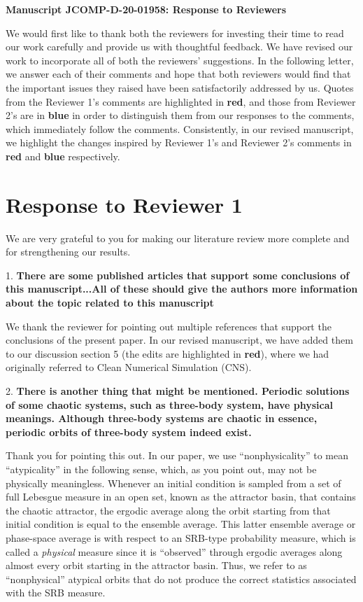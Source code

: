 \documentclass[11pt]{article}
\title{}
\author{}
\date{30th October 2020}
\newcommand{\reviewerOne}[1]{{\color{burgundy}\textbf{#1}}}
\newcommand{\reviewerTwo}[1]{{\color{azure}\textbf{#1}}}
\begin{document}
\begin{center}
		\Large{\textbf{Manuscript JCOMP-D-20-01958: Response to Reviewers}}
\end{center}
\medskip
We would first like to thank both the reviewers for investing their time to read our work carefully and provide us with thoughtful feedback. We have revised our work to incorporate all of both the reviewers' suggestions. In the following letter, we answer each of their comments and hope that both reviewers would find that the 
important issues they raised have been satisfactorily addressed by us.
Quotes from the Reviewer 1's comments are highlighted in \reviewerOne{red}, and those from Reviewer 2's are in \reviewerTwo{blue} in order to distinguish them from our responses to the comments, which immediately follow the comments. Consistently, in our revised manuscript, we highlight the changes inspired by Reviewer 1's and Reviewer 2's comments in \reviewerOne{red} and \reviewerTwo{blue} respectively.
\section{Response to Reviewer 1}
We are very grateful to you for making our literature review more complete and for strengthening our results.

1. \reviewerOne{There are some published articles that support some conclusions of this manuscript...All of these should give the authors more information about the topic related to this manuscript}

We thank the reviewer for pointing out multiple references that support the conclusions of the present paper. In our revised manuscript, we have added them to our discussion section 5 (the edits are highlighted in \reviewerOne{red}), where we had originally referred to Clean Numerical Simulation (CNS).


2. \reviewerOne{There is another thing that might be mentioned.  Periodic solutions of some chaotic systems, such as three-body system, have physical meanings.  Although three-body systems are chaotic in essence, periodic orbits of three-body system indeed exist.}

Thank you for pointing this out. In our paper, we use ``nonphysicality'' to mean ``atypicality'' in the following sense, which, as you point out, may not be physically meaningless. Whenever an initial condition is sampled from a set of full Lebesgue measure in an open set, known as the attractor basin, that contains the chaotic attractor, the ergodic average along the orbit starting from that initial condition is equal to the ensemble average. This latter ensemble average or phase-space average is with respect to an SRB-type probability measure, which is called a {\em physical} measure \cite{young} since it is ``observed'' through ergodic averages along almost every orbit starting in the attractor basin. Thus, we refer to as ``nonphysical'' atypical orbits that do not produce the correct statistics associated with the SRB measure. 
\end{document}
